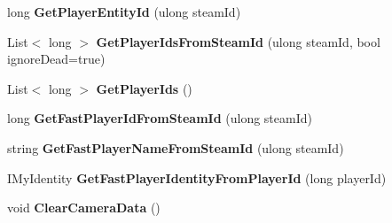 \begin{DoxyCompactItemize}
\item 
\hypertarget{class_s_e_mod_a_p_i_internal_1_1_a_p_i_1_1_common_1_1_player_map_af703c90d971dd2037a88f1c9ce6ef1f1}{}long {\bfseries Get\+Player\+Entity\+Id} (ulong steam\+Id)\label{class_s_e_mod_a_p_i_internal_1_1_a_p_i_1_1_common_1_1_player_map_af703c90d971dd2037a88f1c9ce6ef1f1}

\item 
\hypertarget{class_s_e_mod_a_p_i_internal_1_1_a_p_i_1_1_common_1_1_player_map_a12553c4b808d46d7be574eb995e0d65c}{}List$<$ long $>$ {\bfseries Get\+Player\+Ids\+From\+Steam\+Id} (ulong steam\+Id, bool ignore\+Dead=true)\label{class_s_e_mod_a_p_i_internal_1_1_a_p_i_1_1_common_1_1_player_map_a12553c4b808d46d7be574eb995e0d65c}

\item 
\hypertarget{class_s_e_mod_a_p_i_internal_1_1_a_p_i_1_1_common_1_1_player_map_a66d7dc60d96fc9aa8af008169c3da35a}{}List$<$ long $>$ {\bfseries Get\+Player\+Ids} ()\label{class_s_e_mod_a_p_i_internal_1_1_a_p_i_1_1_common_1_1_player_map_a66d7dc60d96fc9aa8af008169c3da35a}

\item 
\hypertarget{class_s_e_mod_a_p_i_internal_1_1_a_p_i_1_1_common_1_1_player_map_a24e1d73f718e6e7684ee7dffa56c9703}{}long {\bfseries Get\+Fast\+Player\+Id\+From\+Steam\+Id} (ulong steam\+Id)\label{class_s_e_mod_a_p_i_internal_1_1_a_p_i_1_1_common_1_1_player_map_a24e1d73f718e6e7684ee7dffa56c9703}

\item 
\hypertarget{class_s_e_mod_a_p_i_internal_1_1_a_p_i_1_1_common_1_1_player_map_afe4b9eee5fa34f06d0f29a9f690f912d}{}string {\bfseries Get\+Fast\+Player\+Name\+From\+Steam\+Id} (ulong steam\+Id)\label{class_s_e_mod_a_p_i_internal_1_1_a_p_i_1_1_common_1_1_player_map_afe4b9eee5fa34f06d0f29a9f690f912d}

\item 
\hypertarget{class_s_e_mod_a_p_i_internal_1_1_a_p_i_1_1_common_1_1_player_map_acab2e12021bed37bc45a8ceff55563b3}{}I\+My\+Identity {\bfseries Get\+Fast\+Player\+Identity\+From\+Player\+Id} (long player\+Id)\label{class_s_e_mod_a_p_i_internal_1_1_a_p_i_1_1_common_1_1_player_map_acab2e12021bed37bc45a8ceff55563b3}

\item 
\hypertarget{class_s_e_mod_a_p_i_internal_1_1_a_p_i_1_1_common_1_1_player_map_a09c805b7cc9681db3495f111709f4c2a}{}void {\bfseries Clear\+Camera\+Data} ()\label{class_s_e_mod_a_p_i_internal_1_1_a_p_i_1_1_common_1_1_player_map_a09c805b7cc9681db3495f111709f4c2a}


\end{DoxyCompactItemize}
